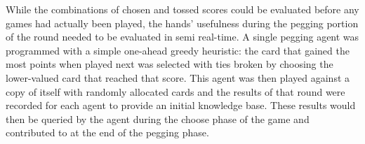 

While the combinations of chosen and tossed scores could be evaluated before any
games had actually been played,
the hands' usefulness during the pegging portion of the round needed to be
evaluated in semi real-time.
%
A single pegging agent was programmed with a simple one-ahead greedy heuristic:
the card that gained the most points when played next was selected with ties
broken by choosing the lower-valued card that reached that score.
%
This agent was then played against a copy of itself with randomly allocated
cards and the results of that round were recorded for each agent to provide an
initial knowledge base.
%
These results would then be queried by the agent during the choose phase of the
game and contributed to at the end of the pegging phase.

